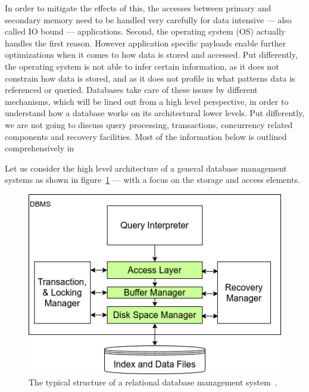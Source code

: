     In order to mitigate the effects of this, the accesses between primary and secondary memory need to be handled very carefully for data intensive --- also called IO bound --- applications.
    Second, the operating system (OS) actually handles the first reason. 
    However application specific payloads enable further optimizations when it comes to how data is stored and accessed.
    Put differently, the operating system is not able to infer certain information, as it does not constrain how data is stored, and as it does not profile in what patterns data is referenced or queried.
    Databases take care of these issues by different mechanisms, which will be lined out from a high level perspective, in order to understand how a database works on its architectural lower levels.
    Put differently, we are not going to discuss query processing, transactions, concurrency related components and recovery facilities.
    Most of the information below is outlined comprehensively in~\autocite{ramakrishnan2000database, silberschatz1997database}
    
    Let us consider the high level architecture of a general database management systems as shown in figure~\ref{dbms_arch} --- with a focus on the storage and access elements.

    \begin{figure}[htp]
    \begin{center}
    \includegraphics[keepaspectratio,width=.5\textwidth]{img/04-databases/RDBMS.png}
    \end{center}
    \caption{The typical structure of a relational database management system~\autocite{ramakrishnan2000database}.}
    \label{dbms_arch}
    \end{figure}

